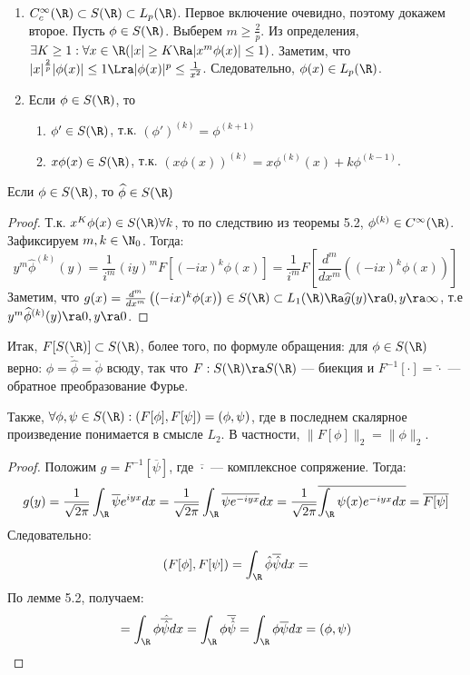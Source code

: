 \begin{note}
    \begin{enumerate}
        \item \(C_c^\infty(\R) \subset S(\R) \subset L_p(\R)\). Первое включение очевидно, поэтому докажем второе. Пусть \(\phi \in S(\R)\). Выберем \(m \ge \frac{2}{p}\). Из определения, \(\exists K \ge 1: \forall x \in \R (|x| \ge K \Ra |x^m\phi(x)| \le 1)\). Заметим, что \(|x|^{\frac{2}{p}}|\phi(x)| \le 1 \Lra |\phi(x)|^p \le \frac{1}{x^2}\). Следовательно, \(\phi(x) \in L_p(\R)\).
        \item Если \(\phi \in S(\R)\), то 
        \begin{enumerate}
            \item \(\phi' \in S(\R)\), т.к. \((\phi')^{(k)} = \phi^{(k + 1)}\)
            \item \(x\phi(x) \in S(\R)\), т.к. \((x\phi(x))^{(k)} = x\phi^{(k)}(x) + k\phi^{(k - 1)}\).
        \end{enumerate}
    \end{enumerate}
\end{note}

\begin{lemma}
    Если \(\phi \in S(\R)\), то \(\widehat{\phi} \in S(\R)\)
\end{lemma}
\begin{proof}
    Т.к. \(x^K\phi(x) \in S(\R) \forall k\), то по следствию из теоремы 5.2, \(\phi^{(k)} \in C^\infty(\R)\). Зафиксируем \(m, k \in \N_0\). Тогда:
    \[y^m \widehat{\phi}^{(k)}(y) = \frac{1}{i^m}(iy)^m F[(-ix)^k\phi(x)] = \frac{1}{i^m}F\left[ \frac{d^m}{dx^m}\left( (-ix)^k\phi(x) \right) \right]\]
    Заметим, что \(g(x) = \frac{d^m}{dx^m}\left( (-ix)^k\phi(x) \right) \in S(\R) \subset L_1(\R) \Ra \widehat{g}(y) \ra 0, y \ra \infty\), т.е \(y^m\widehat{\phi}^{(k)}(y) \ra 0, y \ra 0\).
\end{proof}

Итак, \(F[S(\R)] \subset S(\R)\), более того, по формуле обращения: для \(\phi \in S(\R)\) верно: \(\phi = \check{\hat{\phi}} = \hat{\check{\phi}}\) всюду, так что \(F: S(\R) \ra S(\R)\) --- биекция и \(F^{-1}[\cdot] = \check{\cdot}\) --- обратное преобразование Фурье.

Также, \(\forall \phi, \psi \in S(\R): (F[\phi], F[\psi]) = (\phi, \psi)\), где в последнем скалярное произведение понимается в смысле \(L_2\). В частности, \(\|F[\phi]\|_2 = \|\phi\|_2\).

\begin{proof}
    Положим \(g = F^{-1}[\overline{\psi}]\), где \(\overline{\cdot}\) --- комплексное сопряжение. Тогда:
    \[g(y) = \frac{1}{\sqrt{2\pi}}\int_\R \overline{\psi} e^{iyx}dx = \frac{1}{\sqrt{2\pi}}\int_\R \overline{\psi e^{-iyx}}dx = \frac{1}{\sqrt{2\pi}}\overline{\int_\R \psi(x)e^{-iyx}dx} = \overline{F[\psi]}\]
    Следовательно:
    \[(F[\phi], F[\psi]) = \int_\R\hat{\phi}\overline{\hat{\psi}}dx =\]
    По лемме 5.2, получаем:
    \[= \int_\R\phi\hat{\overline{\hat{\psi}}}dx = \int_\R \phi\overline{\check{\hat{\psi}}} = \int_\R \phi\overline{\psi}dx = (\phi, \psi)\]
\end{proof}

